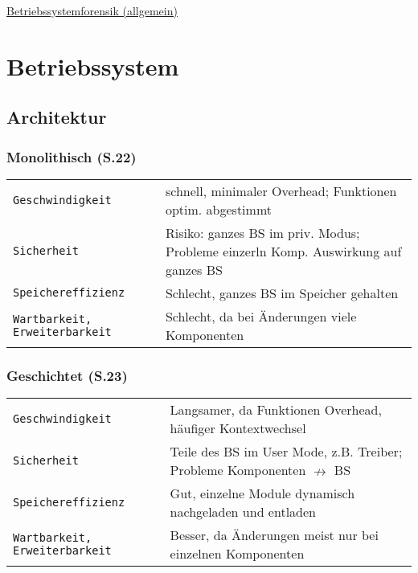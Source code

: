 \raggedright
\footnotesize
\begin{multicols}{3}	
	\setlength{\premulticols}{1pt}
	\setlength{\postmulticols}{1pt}
	\setlength{\multicolsep}{1pt}
	\setlength{\columnsep}{2pt}

\begin{center}
     \Large{\underline{Betriebssystemforensik (allgemein)}} \\
\end{center}

\section{Betriebssystem}
\subsection{Architektur}
\subsubsection{Monolithisch (S.22)}
\begin{tabular}{@{}p{\the\MyLen}%
		@{}p{\linewidth-\the\MyLen}@{}}
	\texttt{Geschwindigkeit} & schnell, minimaler Overhead; Funktionen optim. abgestimmt\\
	\texttt{Sicherheit} & Risiko: ganzes BS im priv. Modus; Probleme einzerln Komp. Auswirkung auf ganzes BS\\
	\texttt{Speichereffizienz} & Schlecht, ganzes BS im Speicher gehalten\\
	\texttt{Wartbarkeit, Erweiterbarkeit} & Schlecht, da bei Änderungen viele Komponenten\\
\end{tabular}

\subsubsection{Geschichtet (S.23)}
\begin{tabular}{@{}p{\the\MyLen}%
		@{}p{\linewidth-\the\MyLen}@{}}
	\texttt{Geschwindigkeit} & Langsamer, da Funktionen Overhead, häufiger Kontextwechsel\\
	\texttt{Sicherheit} & Teile des BS im User Mode, z.B. Treiber; Probleme Komponenten $\nrightarrow$ BS\\
	\texttt{Speichereffizienz} & Gut, einzelne Module dynamisch nachgeladen und entladen\\
	\texttt{Wartbarkeit, Erweiterbarkeit} & Besser, da Änderungen meist nur bei einzelnen Komponenten\\
\end{tabular}


\end{multicols}
